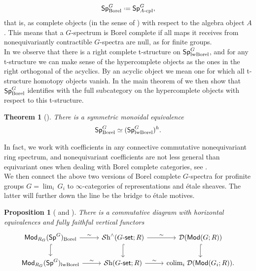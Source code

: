 \documentclass[reqno]{amsart}
\numberwithin{equation}{section}\theoremstyle{thms}
\newtheorem*{thm*}{Theorem}
\newtheorem*{prop*}{Proposition}
\theoremstyle{defn}
\newcommand{\cD}{\mathcal{D}}
\newcommand{\tn}[1]{\textnormal{#1}}
\newcommand{\tsf}[1]{\textsf{\textup{#1}}}
\newcommand{\mcal}[1]{\mathcal{#1}}
\newcommand*{\defeq}{\mathrel{\vcenter{\baselineskip0.4ex \lineskiplimit0pt
\hbox{\scriptsize.}\hbox{\scriptsize.}}}%
=}
\newcommand{\sheaves}{\mcal{S}\tn{h}}
\newcommand{\modgr}{\tsf{Mod}(G;R)}
\newcommand{\Mod}{\tsf{Mod}}
\newcommand{\specg}{\tsf{Sp}^G}
\newcommand{\gset}{G\tsf{-set}}
\begin{document}
$$\specg_{\tn{Borel}} \defeq \specg_{A\tn{-cpl}},$$
that is, as complete objects (in the sense of \cite[§2.2]{mnn17}) with respect to the algebra object $A$. This means that a $G$-spectrum is Borel complete if all maps it receives from nonequivariantly contractible $G$-spectra are null, as for finite groups. \\
In  we observe that there is a right complete t-structure on $\specg_{\tn{lwBorel}}$, and for any t-structure we can make sense of the hypercomplete objects as the ones in the right orthogonal of the acyclics. By an acyclic object we mean one for which all t-structure homotopy objects vanish. In the main theorem of  we then show that $\specg_{\tn{Borel}}$ identifies with the full subcategory on the hypercomplete objects with respect to this t-structure.

\begin{thm*}[]
There is a symmetric monoidal equivalence
$$\specg_{\tn{Borel}} \simeq (\specg_{\tn{lwBorel}})^h.$$
\end{thm*}

\noindent In fact, we work with coefficients in any connective commutative nonequivariant ring spectrum, and nonequivariant coefficients are not less general than equivariant ones when dealing with Borel complete categories, see .\\
We then connect the above two versions of Borel complete $G$-spectra for profinite groups $G=\lim_i \, G_i$ to $\infty$-categories of representations and étale sheaves. The latter will further down the line be the bridge to étale motives. 

\begin{prop*}[ and ]
There is a commutative diagram with horizontal equivalences and fully faithful vertical functors
\[\begin{tikzcd}
	{\Mod_{R_G}(\specg)_{\tn{Borel}}} & {\sheaves^{\wedge}(\gset;R)} & {\cD(\modgr)} \\
	{\Mod_{R_G}(\specg)_{\tn{lwBorel}}} & {\sheaves(\gset;R)} & {\tn{colim}_i \; \cD(\Mod(G_i;R)).}
	\arrow["\sim", from=1-1, to=1-2]
	\arrow[hook, from=1-1, to=2-1]
	\arrow["\sim", from=1-2, to=1-3]
	\arrow[hook, from=1-2, to=2-2]
	\arrow[hook, from=1-3, to=2-3]
	\arrow["\sim", from=2-1, to=2-2]
	\arrow["\sim", from=2-2, to=2-3]
\end{tikzcd}\]
\end{prop*}
\end{document}
